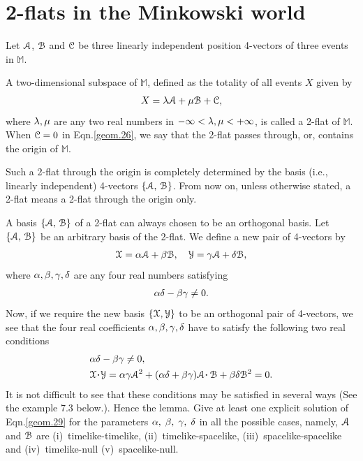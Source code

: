 \section{2-flats in the Minkowski world}
Let  $\EuScript{A}$, $\EuScript{B}$ and $\EuScript{C}$ 
be three {linearly independent} position  4-vectors of 
three events in $\mathbb{M}$. 

  A two-dimensional subspace 
of 
$ \mathbb{M}$, defined as the totality of all events $ 
X $ given by
\begin{align}\label{geom.26}
 X = {\lambda}\EuScript{A} +{\mu} \EuScript{B}+ \EuScript{C},
\end{align}
where ${\lambda},{\mu} $ are any two real numbers in 
$-\infty< {\lambda},{\mu}< +\infty $, is called a 2-flat of 
$\mathbb{M}$.
 When 
$\EuScript{C}=0$ in Eqn.\eqref{geom.26}, we say that 
the  2-flat passes through, or,  contains the origin 
of 
$\mathbb{M}$.

Such a 2-flat through the origin is completely   
determined by the basis (i.e., linearly independent)  
4-vectors $\{\EuScript{A}, \,\EuScript{B} \}$. From 
now 
on, unless otherwise stated, {a 2-flat means a 2-flat 
through the origin only}.

\Lem A basis $\{\EuScript{A}, \,\EuScript{B} \}$ of a 
2-flat can always chosen to be an orthogonal basis. 
\prf Let $\{\EuScript{A}, \,\EuScript{B}\}$ be an 
arbitrary basis of the 2-flat. We define a new pair of 
4-vectors by
\begin{align}\label{geom.27}
 \EuScript{X} ={\alpha}\EuScript{A}+{\beta}
\EuScript{B},\quad \EuScript{Y}
={\gamma} \EuScript{A}+{\delta}\EuScript{B},
\end{align}
where $ {\alpha},{\beta},{\gamma},{\delta} $ are any four real numbers
satisfying
\begin{align} \label{geom.28}
 {\alpha}{\delta}-{\beta}{\gamma}\neq 0.
\end{align}
Now, if we require the new basis $\{\EuScript{X}, 
\EuScript{Y}\} $ to be an  orthogonal pair of  
4-vectors, we see that the {four} real coefficients $ 
{\alpha},{\beta},{\gamma},{\delta} $ have to satisfy the following 
{two} real conditions
\begin{align}\label{geom.29}
&\gka\gkd-\gkb\gkg\neq
0,\notag\\& \EuScript{X}\dotp \EuScript{Y}= \gka\gkg
\EuScript{A}^2+(\gka\gkd+ \gkb\gkg)
\EuScript{A} \dotp \,
\EuScript{B} +\gkb\gkd\EuScript{B}^2 =0.
\end{align}
It is not difficult to see that these conditions may be 
satisfied in several ways (See the example 7.3 below.). 
Hence the lemma.
\exm Give at least one explicit solution of 
Eqn.\eqref{geom.29} for the parameters 
${\alpha},\;{\beta},\;{\gamma},\;{\delta} $ in all the possible 
cases, 
namely,  $\EuScript{A}$ and $\EuScript{B}$ are 
(i)~timelike-timelike,  (ii)~timelike-spacelike, 
(iii)~space\break like-spacelike  and (iv)~timelike-null  
(v)~spacelike-null.

